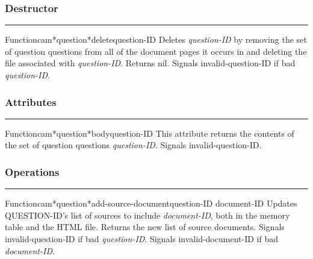 \subsubsection*{Destructor}
\par\vspace*{0.00in}\par\hrule\par\medskip\par


\begin{functiondoc}{Function}{cam*question*delete}{question-ID}
Deletes {\em question-ID} by removing the set of question questions from all of the 
document pages it occurs in and deleting the file associated with {\em question-ID}.
Returns nil.
Signals invalid-question-ID if bad {\em question-ID}.
\end{functiondoc}


\subsubsection*{Attributes}
\par\vspace*{0.00in}\par\hrule\par\medskip\par


\begin{functiondoc}{Function}{cam*question*body}{question-ID}
This attribute returns the contents of the set of question questions {\em question-ID}.
Signals invalid-question-ID.
\end{functiondoc}


\subsubsection*{Operations}
\par\vspace*{0.00in}\par\hrule\par\medskip\par


\begin{functiondoc}{Function}{cam*question*add-source-document}{question-ID document-ID}
Updates QUESTION-ID's list of sources to include {\em document-ID}, both in the 
memory table and the HTML file.
Returns the new list of source documents.
Signals invalid-question-ID if bad {\em question-ID}.
Signals invalid-document-ID if bad {\em document-ID}.
\end{functiondoc}

